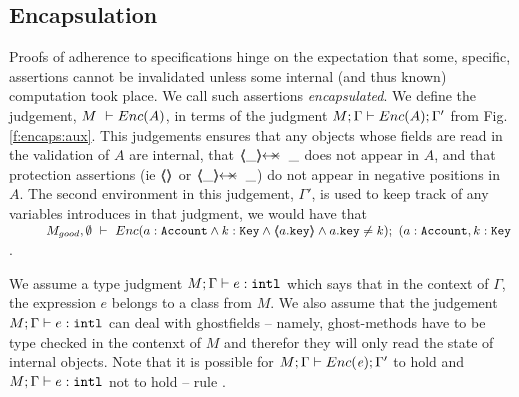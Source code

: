 \completeProof




\subsection{Encapsulation}

{
Proofs of adherence to {\SpecLang specifications  hinge on the expectation that some, 
specific, assertions cannot be invalidated unless some 
} internal (and thus known) computation took place. 
{We call such assertions   \emph{encapsulated}.}
}
We define the  judgement,  $M\ \vdash  {\ensuremath Enc( A )}$, in terms of the judgment  $M; \Gamma \vdash {\ensuremath Enc( A )}  ; \Gamma'$ from Fig. \ref{f:encaps:aux}.
This judgements ensures   that any objects whose fields  are read  in the validation of $A$ are internal, 
that $\protectedFrom {\_} {\_}$  does not appear in $A$,  and that protection assertions (ie $\langle\!\!\langle  \rangle\!\!\rangle$ or $\protectedFrom {\_} {\_}$) do not appear in negative positions in $A$. The second environment in this judgement, $\Gamma'$, is used to keep track of any variables introduces in that judgment, \eg we would have that\\
$\strut \hspace{1cm} M_{good}, \emptyset\ \vdash\ \encaps{a:\prg{Account}\wedge  k:\prg{Key} \wedge \inside{a.\prg{key}} \wedge a.\prg{key}\neq k}; \ (a:\prg{Account}, k:\prg{Key}$.


We assume a type judgment $M; \Gamma \vdash e :  \mbox{\normalfont{\texttt{intl}}}$ which says that in the context of $\Gamma$, the expression $e$ belongs to a class from $M$.
We also assume that the judgement $M; \Gamma \vdash e :  \mbox{\normalfont{\texttt{intl}}}$ can deal with ghostfields -- namely, ghost-methods have to be type checked in the contenxt of $M$ and therefor they will only read the state of internal objects.
Note that it is possible for $M; \Gamma \vdash {\ensuremath Enc( \mathit{e})}; \Gamma'$ to hold and 
$M; \Gamma \vdash  e : \mbox{\normalfont{\texttt{intl}}}$ not to hold -- \cf rule {}.


